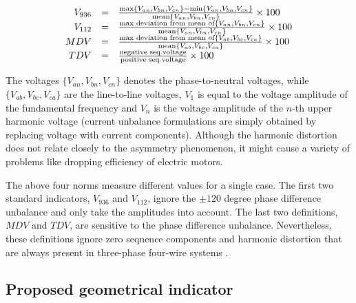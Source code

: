             \begin{equation}
                \begin{array}{rcl}
              V_{936}&=&\frac{\max\{V_{an},V_{bn},V_{cn}\}-\min\{V_{an},V_{bn},V_{cn}\}}{\textnormal{mean}\{V_{an},V_{bn},V_{cn}\}}\times100\\
              V_{112}&=&\frac{\textnormal{max deviation from mean of}\{V_{an},V_{bn},V_{cn}\}}{\textnormal{mean}\{V_{an},V_{bn},V_{cn}\}}\times100\\
              MDV&=&\frac{\textnormal{max deviation from mean of}\{V_{ab},V_{bc},V_{ca}\}}{\textnormal{mean}\{V_{ab},V_{bc},V_{ca}\}}\times100\\
              TDV&=&\frac{\textnormal{negative seq.voltage}}{\textnormal{positive seq.voltage}}\times100
              \end{array}
              \label{equ:regular}
              \end{equation}

            The voltages $\{V_{an},V_{bn},V_{cn}\}$ denotes the phase-to-neutral voltages, while $\{V_{ab},V_{bc},V_{ca}\}$ are the line-to-line voltages, $V_1$ is equal to the voltage amplitude of the fundamental frequency and $V_n$ is the voltage amplitude of the $n$-th upper harmonic voltage \cite{bina2011three}  (current unbalance formulations are simply obtained by replacing voltage with current components). Although the harmonic distortion does not relate closely to the asymmetry phenomenon, it might cause a variety of problems like dropping efficiency of electric motors.

            The above four norms measure different values for a single case. The first two standard indicators, $V_{936}$ and $V_{112}$, ignore the $\pm120$ degree phase difference unbalance and only take the amplitudes into account. The last two definitions, $MDV$ and $TDV$, are sensitive to the phase difference unbalance. Nevertheless, these definitions ignore zero sequence components and harmonic distortion that are always present in three-phase four-wire systems \cite{bina2011three}.

        \subsection{Proposed geometrical indicator}

